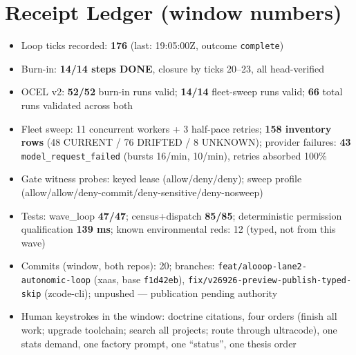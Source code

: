 \documentclass[11pt,a4paper]{article}
\theoremstyle{remark}
\newcommand{\term}[1]{\texttt{#1}}
\begin{document}
\section{Receipt Ledger (window numbers)}
\begin{itemize}
\item Loop ticks recorded: \textbf{176} (last: 19:05:00Z, outcome \term{complete})
\item Burn-in: \textbf{14/14 steps DONE}, closure by ticks 20--23, all head-verified
\item OCEL v2: \textbf{52/52} burn-in runs valid; \textbf{14/14} fleet-sweep runs valid; \textbf{66} total runs validated across both
\item Fleet sweep: 11 concurrent workers + 3 half-pace retries; \textbf{158 inventory rows} (48 CURRENT / 76 DRIFTED / 8 UNKNOWN); provider failures: \textbf{43} \term{model\_request\_failed} (bursts 16/min, 10/min), retries absorbed 100\%
\item Gate witness probes: keyed lease (allow/deny/deny); sweep profile (allow/allow/deny-commit/deny-sensitive/deny-nosweep)
\item Tests: wave\_loop \textbf{47/47}; census+dispatch \textbf{85/85}; deterministic permission qualification \textbf{139 ms}; known environmental reds: 12 (typed, not from this wave)
\item Commits (window, both repos): 20; branches: \term{feat/alooop-lane2-autonomic-loop} (xaas, base \term{f1d42eb}), \term{fix/v26926-preview-publish-typed-skip} (zcode-cli); unpushed --- publication pending authority
\item Human keystrokes in the window: doctrine citations, four orders (finish all work; upgrade toolchain; search all projects; route through ultracode), one stats demand, one factory prompt, one ``status'', one thesis order
\end{itemize}
\end{document}
